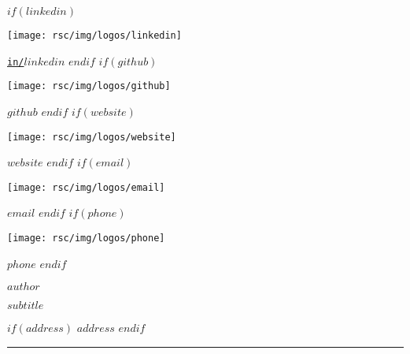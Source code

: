 \documentclass[
$if(fontsize)$
    $fontsize$,
$endif$
$if(lang)$
    $babel-lang$,
$endif$
$if(papersize)$
    $papersize$paper,
$endif$
$for(classoption)$
    $classoption$$sep$,
$endfor$
]{$documentclass$}
\makeatletter
\newcommand{\HRule}{\noindent\rule{\linewidth}{0.1mm}}
\newcommand{\mhref}[2]{\href{#2}{\texttt{#1}}}
\newcommand{\setlocalcolumnwidth}[1]{%
  \let\oldratio\pcol@columnratioleft
  \setcolumnwidth{#1}%
}
\newcommand{\restorelocalcolumnwidth}{%
  \let\pcol@columnratioleft\oldratio%
}
\makeatother
\begin{document}
\pagestyle{allpagestyle}

\thispagestyle{firstpagestyle}
\vspace*{-2cm}
\setlocalcolumnwidth{4cm, 10cm, 4cm}
\begin{paracol}{3}
\begin{flushleft}
    \scriptsize
    \vspace*{\fill}
    $if(linkedin)$
        \begin{minipage}{0.8\baselineskip}
            \texttt{[image: rsc/img/logos/linkedin]}
        \end{minipage}
        \mhref{in/$linkedin$}{https://www.linkedin.com/in/$linkedin$}
        \linebreak
    $endif$
    $if(github)$
        \begin{minipage}{0.8\baselineskip}
            \texttt{[image: rsc/img/logos/github]}
        \end{minipage}
        \mhref{$github$}{https://github.com/$github$}
        \linebreak
    $endif$
    $if(website)$
        \begin{minipage}{0.8\baselineskip}
            \texttt{[image: rsc/img/logos/website]}
        \end{minipage}
        \mhref{$website$}{https://$website$}
        \linebreak
    $endif$
    $if(email)$
        \begin{minipage}{0.8\baselineskip}
            \texttt{[image: rsc/img/logos/email]}
        \end{minipage}
        \mhref{$email$}{mailto:$email$?subject=Heyy!&body=What can I do for you? :)}
        \linebreak
    $endif$
    $if(phone)$
        \begin{minipage}{0.8\baselineskip}
            \texttt{[image: rsc/img/logos/phone]}
        \end{minipage}
        $phone$
    $endif$
\end{flushleft}
\switchcolumn[1]

\begin{center}
    \huge
    \vspace*{\fill}
    \textbf{$author$}
    \vspace{0.1cm}

    \scriptsize
    $subtitle$
\end{center}
\switchcolumn[2]

\begin{flushright}
    \scriptsize
    \vspace*{\fill}
    $if(address)$
        $address$
    $endif$
\end{flushright}
\end{paracol}
\restorelocalcolumnwidth
\vspace{-0.5cm}
\HRule
\vspace{0cm}
\end{document}
